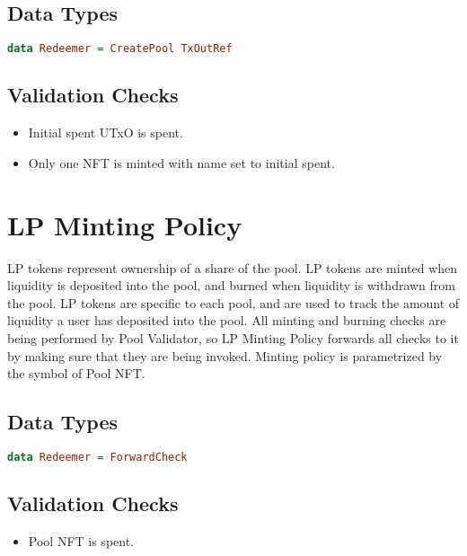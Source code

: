 \documentclass{article}
\begin{document}
\subsection{Data Types}
\begin{lstlisting}[language=Haskell]
data Redeemer = CreatePool TxOutRef
\end{lstlisting}

\subsection{Validation Checks}
\begin{itemize}
  \item Initial spent UTxO is spent.
  \item Only one NFT is minted with name set to initial spent.
\end{itemize}

\section{LP Minting Policy}

LP tokens represent ownership of a share of the pool.
LP tokens are minted when liquidity is deposited into the pool, and burned when liquidity is withdrawn from the pool.
LP tokens are specific to each pool, and are used to track the amount of liquidity a user has deposited into the pool.
All minting and burning checks are being performed by Pool Validator, so LP Minting Policy forwards all checks to it by making sure that they are being invoked.
Minting policy is parametrized by the symbol of Pool NFT.

\subsection{Data Types}
\begin{lstlisting}[language=Haskell]
data Redeemer = ForwardCheck
\end{lstlisting}

\subsection{Validation Checks}

\begin{itemize}
  \item Pool NFT is spent.
\end{itemize}

\nocite{*}

{}
\end{document}
